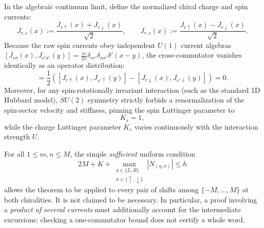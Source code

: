 \begin{proposition}
\label{prop:ch21-continuum-charge-spin-decoupling}
In the algebraic continuum limit, define the normalized chiral charge and spin currents:
\begin{equation}
 J_{r,c}(x) := \frac{J_{r\uparrow}(x) + J_{r\downarrow}(x)}{\sqrt{2}}, \qquad
 J_{r,s}(x) := \frac{J_{r\uparrow}(x) - J_{r\downarrow}(x)}{\sqrt{2}}.
 \label{eq:ch21-normalized-chiral-currents}
\end{equation}
Because the raw spin currents obey independent $U(1)$ current algebras $[J_{r\sigma}(x), J_{r'\sigma'}(y)] = \frac{i r}{2\pi}\delta_{rr'}\delta_{\sigma\sigma'}\delta'(x-y)$,
the cross-commutator vanishes identically as an operator distribution:
\begin{equation}
 [J_{r,c}(x), J_{r',s}(y)] = \frac{1}{2}\left( [J_{r\uparrow}(x), J_{r'\uparrow}(y)] - [J_{r\downarrow}(x), J_{r'\downarrow}(y)] \right) = 0.
 \label{eq:ch21-charge-spin-zero-dist}
\end{equation}
Moreover, for any spin-rotationally invariant interaction (such as the standard 1D Hubbard model),
$SU(2)$ symmetry strictly forbids a renormalization of the spin-sector velocity and stiffness,
pinning the spin Luttinger parameter to
\begin{equation}
 K_s = 1,
 \label{eq:ch21-Ks-pinned}
\end{equation}
while the charge Luttinger parameter $K_c$ varies continuously with the interaction strength $U$.
\end{proposition}

For all $1\leq m,n\leq M$, the simple \emph{sufficient} uniform
condition
\begin{equation}
 2M+K+\max_{\substack{\eta\in\{L,R\}\\
                         \sigma\in\{\uparrow,\downarrow\}}}
                   |N_{(\eta,\sigma)}|\leq h
 \label{eq:ch21-uniform-margin}
\end{equation}
allows the theorem to be applied to every pair of shifts among
$\{-M,\ldots,M\}$ at both chiralities.  It is not claimed to be
necessary.  In particular, a proof involving a \emph{product of several
currents} must additionally account for the intermediate excursions;
checking a one-commutator bound does not certify a whole word.

